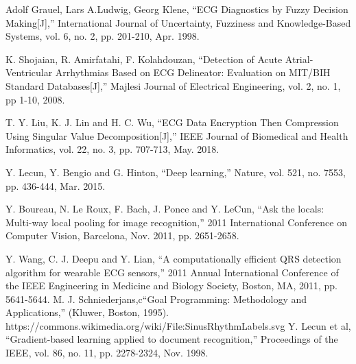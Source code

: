 \documentclass[journal]{IEEEtran}
\begin{document}
{\begin{thebibliography}{99}
		Adolf Grauel, Lars A.Ludwig, Georg Klene, ``ECG Diagnostics by Fuzzy Decision Making[J],'' International Journal of Uncertainty, Fuzziness and Knowledge-Based Systems, vol. 6, no. 2, pp. 201-210, Apr. 1998.

		K. Shojaian, R. Amirfatahi, F. Kolahdouzan, ``Detection of Acute Atrial-Ventricular Arrhythmias Based on ECG Delineator: Evaluation on MIT/BIH Standard Databases[J],'' Majlesi Journal of Electrical Engineering, vol. 2, no. 1, pp 1-10, 2008.

		T. Y. Liu, K. J. Lin and H. C. Wu, ``ECG Data Encryption Then Compression Using Singular Value Decomposition[J],'' IEEE Journal of Biomedical and Health Informatics, vol. 22, no. 3, pp. 707-713, May. 2018.

		Y. Lecun, Y. Bengio and G. Hinton, ``Deep learning,'' Nature, vol. 521, no. 7553, pp. 436-444, Mar. 2015.

		Y. Boureau, N. Le Roux, F. Bach, J. Ponce and Y. LeCun, ``Ask the locals: Multi-way local pooling for image recognition,'' 2011 International Conference on Computer Vision, Barcelona, Nov. 2011, pp. 2651-2658.

		Y. Wang, C. J. Deepu and Y. Lian, ``A computationally efficient QRS detection algorithm for wearable ECG sensors,'' 2011 Annual International Conference of the IEEE Engineering in Medicine and Biology Society, Boston, MA, 2011, pp. 5641-5644.
        M. J. Schniederjans,c``Goal Programming: Methodology and Applications,'' (Kluwer, Boston, 1995).
        https://commons.wikimedia.org/wiki/File:SinusRhythmLabels.svg
        Y. Lecun et al, ``Gradient-based learning applied to document recognition,'' Proceedings of the IEEE, vol. 86, no. 11, pp. 2278-2324, Nov. 1998.


\end{thebibliography}}
\end{document}
